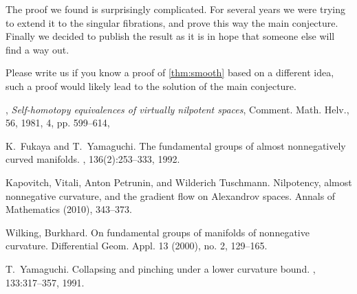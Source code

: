\documentclass{amsart}
\begin{document}
The proof we found is surprisingly complicated.
For several years we were trying to extend it to the singular fibrations, and prove this way the main conjecture.
Finally we decided to publish the result as it is in hope that someone else will find a way out.

Please write us if you know a proof of \ref{thm:smooth} based on a different idea,
such a proof would likely lead to the solution of the main conjecture.

\small

%

\begin{thebibliography}{HMR75}
,
 \textit{Self-homotopy equivalences of virtually nilpotent spaces},
{Comment. Math. Helv.},
{56},
{1981},
{4},
pp. {599--614},

K.~Fukaya and T.~Yamaguchi.
\newblock The fundamental groups of almost nonnegatively curved manifolds.
, 136(2):253--333, 1992.


 Kapovitch, Vitali, Anton Petrunin, and Wilderich Tuschmann. 
\newblock Nilpotency, almost nonnegative curvature, and the gradient flow on Alexandrov spaces. 
\newblock Annals of Mathematics (2010), 343--373.

Wilking, Burkhard. \newblock On fundamental groups of manifolds of nonnegative curvature. \newblock  Differential Geom. Appl.  13  (2000),  no. 2, 129--165.

T.~Yamaguchi.
\newblock Collapsing and pinching under a lower curvature bound.
, 133:317--357, 1991.
\end{thebibliography}
\end{document}
